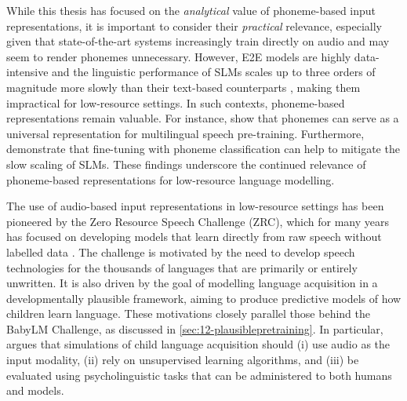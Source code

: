 While this thesis has focused on the \emph{analytical} value of phoneme-based input representations, it is important to consider their \emph{practical} relevance, especially given that state-of-the-art systems increasingly train directly on audio and may seem to render phonemes unnecessary. However, E2E models are highly data-intensive \citep{li2022recent} and the linguistic performance of SLMs scales up to three orders of magnitude more slowly than their text-based counterparts \citep{cuervo2024scaling}, making them impractical for low-resource settings. In such contexts, phoneme-based representations remain valuable. For instance, \citet{feng-2023-language-universal-phonetic} show that phonemes can serve as a universal representation for multilingual speech pre-training. Furthermore, \citet{poli2024improving} demonstrate that fine-tuning with phoneme classification can help to mitigate the slow scaling of SLMs. These findings underscore the continued relevance of phoneme-based representations for low-resource language modelling.



The use of audio-based input representations in low-resource settings has been pioneered by the Zero Resource Speech Challenge (ZRC), which for many years has focused on developing models that learn directly from raw speech without labelled data \citep[see][for an overview]{dunbar2022self}. The challenge is motivated by the need to develop speech technologies for the thousands of languages that are primarily or entirely unwritten. It is also driven by the goal of modelling language acquisition in a developmentally plausible framework, aiming to produce predictive models of how children learn language. These motivations closely parallel those behind the BabyLM Challenge, as discussed in \cref{sec:12-plausiblepretraining}. In particular, \citet{dupoux-2018-cognitive} argues that simulations of child language acquisition should (i) use audio as the input modality, (ii) rely on unsupervised learning algorithms, and (iii) be evaluated using psycholinguistic tasks that can be administered to both humans and models.

